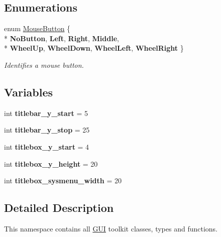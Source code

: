 \subsection*{Enumerations}
\begin{DoxyCompactItemize}
\item 
enum \hyperlink{namespaceGUI_ad06082a7b02aa73697f39eb8e0856de9}{Mouse\-Button} \{ \\*
{\bfseries No\-Button}, 
{\bfseries Left}, 
{\bfseries Right}, 
{\bfseries Middle}, 
\\*
{\bfseries Wheel\-Up}, 
{\bfseries Wheel\-Down}, 
{\bfseries Wheel\-Left}, 
{\bfseries Wheel\-Right}
 \}
\begin{DoxyCompactList}\small\item\em Identifies a mouse button. \end{DoxyCompactList}\end{DoxyCompactItemize}
\subsection*{Variables}
\begin{DoxyCompactItemize}
\item 
\hypertarget{namespaceGUI_a2a11cfb00daf21018459455b666a9860}{int {\bfseries titlebar\-\_\-y\-\_\-start} = 5}\label{namespaceGUI_a2a11cfb00daf21018459455b666a9860}

\item 
\hypertarget{namespaceGUI_a67eec2f124138c75a1bced294d980f11}{int {\bfseries titlebar\-\_\-y\-\_\-stop} = 25}\label{namespaceGUI_a67eec2f124138c75a1bced294d980f11}

\item 
\hypertarget{namespaceGUI_af819c5feb6b1a75c80ac73419f27ec4a}{int {\bfseries titlebox\-\_\-y\-\_\-start} = 4}\label{namespaceGUI_af819c5feb6b1a75c80ac73419f27ec4a}

\item 
\hypertarget{namespaceGUI_ae7484593cc058e07181e1ec64ad662db}{int {\bfseries titlebox\-\_\-y\-\_\-height} = 20}\label{namespaceGUI_ae7484593cc058e07181e1ec64ad662db}

\item 
\hypertarget{namespaceGUI_a96719314808b7d5acf86a305d62b10c2}{int {\bfseries titlebox\-\_\-sysmenu\-\_\-width} = 20}\label{namespaceGUI_a96719314808b7d5acf86a305d62b10c2}

\end{DoxyCompactItemize}


\subsection{Detailed Description}
This namespace contains all \hyperlink{namespaceGUI}{G\-U\-I} toolkit classes, types and functions. 